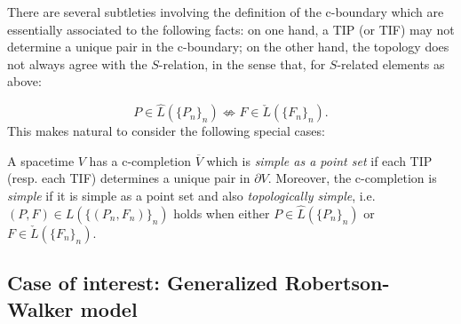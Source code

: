 \smallskip

There are several subtleties involving the definition of the c-boundary which are essentially associated to the following facts: on one hand, a TIP (or TIF) may not determine a unique pair in the c-boundary; on the other hand, the topology does not always agree with the $S$-relation, in the sense that, for $S$-related elements as above:


$$P\in \hat{L}(\{P_n\}_n)\not\Leftrightarrow F\in \check{L}(\{F_n\}_n).$$ This
makes natural to consider the following special cases:
\begin{defi}\label{simpletop}
A spacetime $V$ has a c-completion $\overline{V}$ which is {\em
simple as a point set} if each TIP (resp. each TIF) determines a
unique pair in $\partial V$.
Moreover, the c-completion
is {\em simple} if it is simple as a point set and also {\em
topologically simple}, i.e. $(P,F)\in L(\{(P_{n},F_{n})\}_n)$ holds when
either $P\in \hat{L}(\{P_{n}\}_n)$ or $F\in \check{L}(\{F_{n}\}_n)$.
\end{defi}


\subsection{Case of interest: Generalized Robertson-Walker model}\label{sec:Robertson}

